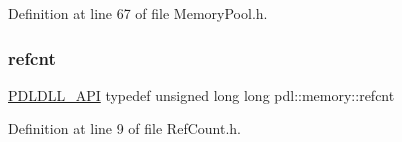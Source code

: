 Definition at line 67 of file Memory\+Pool.\+h.

\mbox{\label{namespacepdl_1_1memory_a45ec9ff2bed0efb7e59d152444c867af}} 
\subsubsection{\texorpdfstring{refcnt}{refcnt}}
{\footnotesize\ttfamily \mbox{\hyperlink{_p_d_core_8h_ae8c5186e53170509c65eaabab6c2c705}{P\+D\+L\+D\+L\+L\+\_\+\+A\+PI}} typedef unsigned long long pdl\+::memory\+::refcnt}



Definition at line 9 of file Ref\+Count.\+h.

